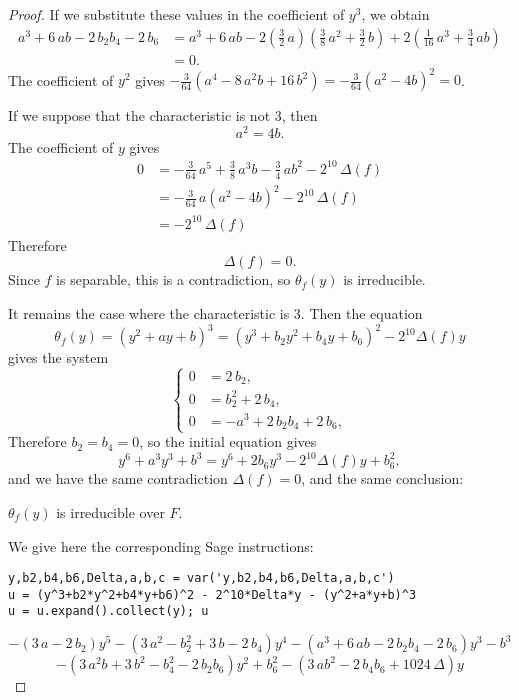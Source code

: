 \documentclass[11pt,a4paper]{article}
\begin{document}
\begin{proof}
If we substitute these values in the coefficient of $y^3$, we obtain
\begin{align*}
a^{3} + 6 \, a b - 2 \, b_{2} b_{4} - 2 \, b_{6} &= a^{3} + 6 \, a b - 2 \left( \frac{3}{2} \, a\right) \left( \frac{3}{8} \, a^{2} +\frac{3}{2} \, b\right) +  2 \left (\frac{1}{16} \, a^{3} + \frac{3}{4} \, ab\right)\\
&=0.
\end{align*}
The coefficient of $y^2$ gives
$-\frac{3}{64} 	 \left( a^{4} - 8 \, a^{2} b + 16 \, b^{2}\right) = -\frac{3}{64} (a^2 - 4b)^2= 0$.

If we suppose that the characteristic is not $3$, then
$$a^2 = 4b.$$
The coefficient of $y$ gives
\begin{align*}
0&=-\frac{3}{64} \, a^{5} + \frac{3}{8} \, a^{3} b - \frac{3}{4} \, a b^{2}- 2^{10} \, \Delta(f)\\
&=-\frac{3}{64}\,  a\left( a^{2} - 4 b\right)^2 - 2^{10} \, \Delta(f)\\
&= - 2^{10} \, \Delta(f)
\end{align*}
Therefore $$\Delta(f) = 0.$$
Since $f$ is separable, this is a contradiction, so $\theta_f(y)$ is irreducible.

It remains the case where the characteristic is 3. Then the equation 
$$\theta_f(y) = (y^2+ay+b)^3 = (y^3 +b_2y^2+b_4y+b_6)^2 - 2^{10} \Delta(f) y$$
gives the system
$$
\left\{
\begin{array}{lll}
0 &= 2 \, b_{2},\\
 0&=b_{2}^{2} + 2 \, b_{4},\\
0&= -a^{3} + 2 \, b_{2} b_{4} + 2 \, b_{6},
\end{array}
\right.
$$
Therefore $b_2 = b_4 = 0$, so the initial equation gives
$$y^6 + a^3 y^3 + b^3 = y^6 + 2b_6 y^3 -2^{10} \Delta(f) y +b_6^2,$$
and we have the same contradiction $\Delta(f) = 0$, and the same conclusion:
\begin{center}
$\theta_f(y)$ is irreducible over $F$.
\end{center}

\bigskip

We give here the corresponding Sage instructions:
\begin{verbatim}
y,b2,b4,b6,Delta,a,b,c = var('y,b2,b4,b6,Delta,a,b,c')
u = (y^3+b2*y^2+b4*y+b6)^2 - 2^10*Delta*y - (y^2+a*y+b)^3
u = u.expand().collect(y); u
\end{verbatim}
\medskip
$$-{\left(3 \, a - 2 \, b_{2}\right)} y^{5} - {\left(3 \, a^{2} -
b_{2}^{2} + 3 \, b - 2 \, b_{4}\right)} y^{4} - {\left(a^{3} + 6 \, a b
- 2 \, b_{2} b_{4} - 2 \, b_{6}\right)} y^{3} - b^{3}$$
$$ - {\left(3 \,
a^{2} b + 3 \, b^{2} - b_{4}^{2} - 2 \, b_{2} b_{6}\right)} y^{2} +
b_{6}^{2} - {\left(3 \, a b^{2} - 2 \, b_{4} b_{6} + 1024 \,
\Delta\right)} y$$


\end{proof}
\end{document}

